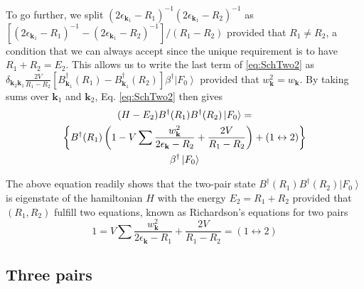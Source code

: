 \documentclass[aps,prb,superscriptaddress,twocolumn]{revtex4}
\begin{document}
To go further, we split $\left(2\epsilon_{\mathbf{k} _1}-R_1\right)
^{-1}\left(2\epsilon_{\mathbf{k} _1}-R_2\right) ^{-1}$ as $\left[%
\left(2\epsilon_{\mathbf{k} _1}-R_1\right) ^{-1}-\left(2\epsilon_{\mathbf{k}
_1}-R_2\right) ^{-1}\right] /\left(R_1-R_2\right) $ provided that $R_1\neq{}%
R_2$, a condition that we can always accept since the unique requirement is to have $R_1+R_2=E_2$. This allows us to write the last term of \eqref{eq:SchTwo2} as $\delta_{{\mathbf{k} _2}{\mathbf{k} _1}}\frac{2V}{R_1-R_2}[B^{\dagger}_{\mathbf{k} _1}(R_1)-B^{\dagger}_{\mathbf{k} _1}(R_2)]\beta^\dagger\left|F_0\right>  $ provided that $w^2_{{\mathbf{k} }}=w_{{\mathbf{k} }}$. By taking sums over $\mathbf{k} _1$ and $\mathbf{k} _2$, Eq. %
\eqref{eq:SchTwo2} then gives 
\begin{multline}  \label{eq:SchTwo3}
(H-E_2)B^{\dagger}(R_1)B^{\dagger}(R_2)\left|F_0\right>   = \\
\left\{B^{\dagger}(R_1)\left(1-V\sum\frac{w_{\mathbf{k} }^2}{2\epsilon_{%
\mathbf{k} }-R_2}+\frac{2V}{R_1-R_2}\right) +(1\leftrightarrow2)\right\}  \\
\beta^{\dagger}\left|F_0\right>  
\end{multline}


The above equation readily shows that the two-pair state $B^{\dagger}(R_1)B^{\dagger}(R_2)%
\left|F_0\right>  $ is eigenstate of the hamiltonian $H$ with the energy $%
E _2=R_1+R_2$ provided that $\left(R_1,R_2\right) $ fulfill two
equations, known as Richardson's equations for two pairs 
\begin{equation}
1=V\sum\frac{w_{\mathbf{k} }^2}{2\epsilon_{\mathbf{k} }-R_1}+\frac{2V}{R_1-R_2}%
=(1\leftrightarrow2)
\end{equation}

\subsection{Three pairs}
\end{document}
